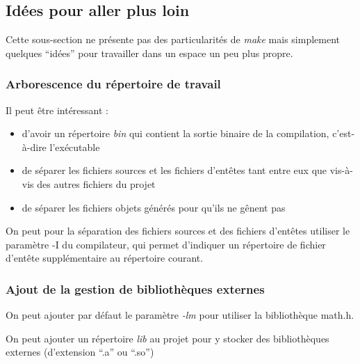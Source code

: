 \documentclass[../../../main.tex]{subfiles}
\begin{document}
\subsection{Idées pour aller plus loin}
Cette sous-section ne présente pas des particularités de \textit{make} mais simplement quelques ``idées'' pour travailler dans un espace un peu plus propre.
\subsubsection{Arborescence du répertoire de travail}
Il peut être intéressant :
\begin{itemize}
	\item d'avoir un répertoire \textit{bin} qui contient la sortie binaire de la compilation, c'est-à-dire l'exécutable
	\item de séparer les fichiers sources et les fichiers d'entêtes tant entre eux que vis-à-vis des autres fichiers du projet
	\item de séparer les fichiers objets générés pour qu'ils ne gênent pas
\end{itemize}
On peut pour la séparation des fichiers sources et des fichiers d'entêtes utiliser le paramètre \textsf{-I} du compilateur, qui permet d'indiquer un répertoire de fichier d'entête supplémentaire au répertoire courant.
\subsubsection{Ajout de la gestion de bibliothèques externes}
On peut ajouter par défaut le paramètre \textit{-lm} pour utiliser la bibliothèque \textsf{math.h}.
 
On peut ajouter un répertoire \textit{lib} au projet pour y stocker des bibliothèques externes (d'extension ``.a'' ou ``.so'')
\end{document}
